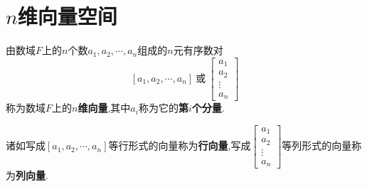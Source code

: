 \documentclass[9pt,a4paper]{book}
\begin{document}
\section{$ n $维向量空间}
\begin{defination}[方程组的解的本质]
	由数域$ F$上的$ n $个数$ a_1,a_2,\cdots,a_n $组成的$ n $元有序数对\[ [a_1,a_2,\cdots,a_n]\ \mbox{或}\ \left[ \begin{array}{c}
	{a_1}\\
	{a_2}\\
	\vdots \\
	{a_n}
	\end{array} \right] \]称为数域$ F$上的$ n $\textbf{维向量},其中$ a_i $称为它的\textbf{第$ i $个分量}.
	
	诸如写成$ [a_1,a_2,\cdots,a_n] $等行形式的向量称为\textbf{行向量},写成$  \left[ \begin{array}{c}
	{a_1}\\
	{a_2}\\
	\vdots \\
	{a_n}
	\end{array} \right]  $等列形式的向量称为\textbf{列向量}.
\end{defination}
\end{document}

